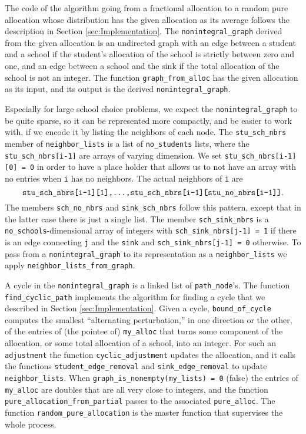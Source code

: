 \documentclass[12pt]{article}
\theoremstyle{definition}
\begin{document}
\begin{appendix}
The code of the algorithm going from a fractional allocation to a
random pure allocation whose distribution has the given allocation as
its average follows the description in Section
\ref{sec:Implementation}.  The \texttt{nonintegral\_graph} derived
from the given allocation is an undirected graph with an edge between
a student and a school if the student's allocation of the school is
strictly between zero and one, and an edge between a school and the
sink if the total allocation of the school is not an integer.  The
function \texttt{graph\_from\_alloc} has the given allocation as its
input, and its output is the derived \texttt{nonintegral\_graph}.

Especially for large school choice problems, we expect the
\texttt{nonintegral\_graph} to be quite sparse, so it can be
represented more compactly, and be easier to work with, if we encode
it by listing the neighbors of each node.  The \texttt{stu\_sch\_nbrs}
member of \texttt{neighbor\_lists} is a list of \texttt{no\_students}
lists, where the \texttt{stu\_sch\_nbrs[i-1]} are arrays of varying
dimension. We set \texttt{stu\_sch\_nbrs[i-1][0] = 0} in order to have
a place holder that allows us to not have an array with no entries
when \texttt{i} has no neighbors.  The actual neighbors of \texttt{i}
are
$$\text{\texttt{stu\_sch\_nbrs[i-1][1],...,stu\_sch\_nbrs[i-1][stu\_no\_nbrs[i-1]]}}.$$
The members \texttt{sch\_no\_nbrs} and \texttt{sink\_sch\_nbrs} follow
this pattern, except that in the latter case there is just a single
list.  The member \texttt{sch\_sink\_nbrs} is a
\texttt{no\_schools}-dimensional array of integers with
\texttt{sch\_sink\_nbrs[j-1] = 1} if there is an edge connecting
\texttt{j} and the \texttt{sink} and \texttt{sch\_sink\_nbrs[j-1] = 0}
otherwise.  To pass from a \texttt{nonintegral\_graph} to its
representation as a \texttt{neighbor\_lists} we apply
\texttt{neighbor\_lists\_from\_graph}.

A cycle in the \texttt{nonintegral\_graph} is a linked list of
\texttt{path\_node}'s.  The function \texttt{find\_cyclic\_path}
implements the algorithm for finding a cycle that we described in
Section \ref{sec:Implementation}.  Given a cycle,
\texttt{bound\_of\_cycle} computes the smallest ``alternating
perturbation,'' in one direction or the other, of the entries of (the
pointee of) \texttt{my\_alloc} that turns some component of the
allocation, or some total allocation of a school, into an integer.
For such an \texttt{adjustment} the function
\texttt{cyclic\_adjustment} updates the allocation, and it calls the
functions \texttt{student\_edge\_removal} and
\texttt{sink\_edge\_removal} to update \texttt{neighbor\_lists}.
When \texttt{graph\_is\_nonempty(my\_lists) = 0} (false) the entries
of \texttt{my\_alloc} are doubles that are all very close to integers,
and the function \texttt{pure\_allocation\_from\_partial} passes to
the associated \texttt{pure\_alloc}.  The function
\texttt{random\_pure\_allocation} is the master function that
supervises the whole process.


\end{appendix}
\end{document}
